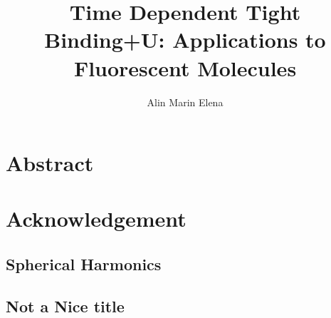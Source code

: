 \documentclass[twoside,a4paper,12pt]{aprilthesis}
\title{Time Dependent Tight Binding+U: Applications to Fluorescent Molecules}
\author{Alin Marin Elena}
\affiliation{The Queen's University of Belfast}
\begin{document}
\pagestyle{empty}
\frontmatter
\maketitle





\chapter{Abstract}


\chapter{Acknowledgement}


\setcounter{tocdepth}{1}
\tableofcontents

\glsaddall
\renewcommand{\glossaryname}{Glossary of Symbols}
\printglossaries


\mainmatter
\pagestyle{fancy}





\begin{appendices}
\chapter[Spherical Harmonics]{Spherical Harmonics}
 
\end{appendices}

\begin{appendices}
\chapter{Not a Nice title}
 
\end{appendices}
\end{document}
